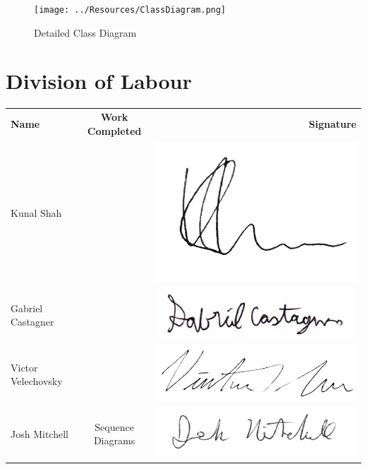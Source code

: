 \documentclass[]{article}
\begin{document}
\begin{figure}[H]
	\texttt{[image: ../Resources/ClassDiagram.png]}
	\caption{Detailed Class Diagram}
\end{figure}

\newpage

\appendix
\section{Division of Labour}
\label{sec:division_of_labour}
\begin{tabular}{l c r}
	\textbf{Name} & \textbf{Work Completed} & \textbf{Signature} \\
	
	Kunal Shah &  & 
	\includegraphics[scale=0.2]{../Resources/Signature/Kunal-Sig.png} \\
	
	Gabriel Castagner &  &
	\includegraphics[scale=0.2]{../Resources/Signature/Gabe-Sig.png} \\
	
	Victor Velechovsky &  & 
	\includegraphics[scale=0.3]{../Resources/Signature/Vic-Sig.png} \\
	
	Josh Mitchell & Sequence Diagrams & 
	\includegraphics[scale=0.2]{../Resources/Signature/Josh-Sig.png} \\
\end{tabular}
\end{document}
